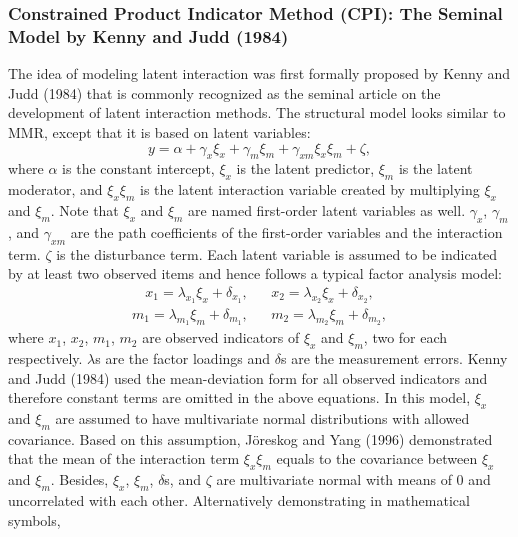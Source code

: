 \documentclass[
  man]{apa7}
\begin{document}
\hypertarget{constrained-product-indicator-method-cpi-the-seminal-model-by-kenny-and-judd-1984}{%
\subsubsection{Constrained Product Indicator Method (CPI): The Seminal Model by Kenny and Judd (1984)}\label{constrained-product-indicator-method-cpi-the-seminal-model-by-kenny-and-judd-1984}}

The idea of modeling latent interaction was first formally proposed by Kenny and Judd (1984) that is commonly recognized as the seminal article on the development of latent interaction methods. The structural model looks similar to MMR, except that it is based on latent variables:
\begin{equation}
y = \alpha + \gamma_{x}\xi_{x} + \gamma_{m}\xi_{m} + \gamma_{xm}\xi_{x}\xi_{m} + \zeta,
\end{equation}
where \(\alpha\) is the constant intercept, \(\xi_{x}\) is the latent predictor, \(\xi_{m}\) is the latent moderator, and \(\xi_{x}\xi_{m}\) is the latent interaction variable created by multiplying \(\xi_{x}\) and \(\xi_{m}\). Note that \(\xi_{x}\) and \(\xi_{m}\) are named first-order latent variables as well. \(\gamma_{x}\), \(\gamma_{m}\), and \(\gamma_{xm}\) are the path coefficients of the first-order variables and the interaction term. \(\zeta\) is the disturbance term. Each latent variable is assumed to be indicated by at least two observed items and hence follows a typical factor analysis model:
\begin{align}
x_{1} = \lambda_{x_{1}}\xi_{x} + \delta_{x_{1}}, && x_{2} = \lambda_{x_{2}}\xi_{x} + \delta_{x_{2}},
\end{align}
\begin{align}
m_{1} = \lambda_{m_{1}}\xi_{m} + \delta_{m_{1}}, && m_{2} = \lambda_{m_{2}}\xi_{m} + \delta_{m_{2}},
\end{align}
where \(x_{1}\), \(x_{2}\), \(m_{1}\), \(m_{2}\) are observed indicators of \(\xi_{x}\) and \(\xi_{m}\), two for each respectively. \(\lambda\)s are the factor loadings and \(\delta\)s are the measurement errors. Kenny and Judd (1984) used the mean-deviation form for all observed indicators and therefore constant terms are omitted in the above equations. In this model, \(\xi_{x}\) and \(\xi_{m}\) are assumed to have multivariate normal distributions with allowed covariance. Based on this assumption, Jöreskog and Yang (1996) demonstrated that the mean of the interaction term \(\xi_{x}\xi_{m}\) equals to the covariance between \(\xi_{x}\) and \(\xi_{m}\). Besides, \(\xi_{x}\), \(\xi_{m}\), \(\delta\)s, and \(\zeta\) are multivariate normal with means of 0 and uncorrelated with each other. Alternatively demonstrating in mathematical symbols,
\end{document}
